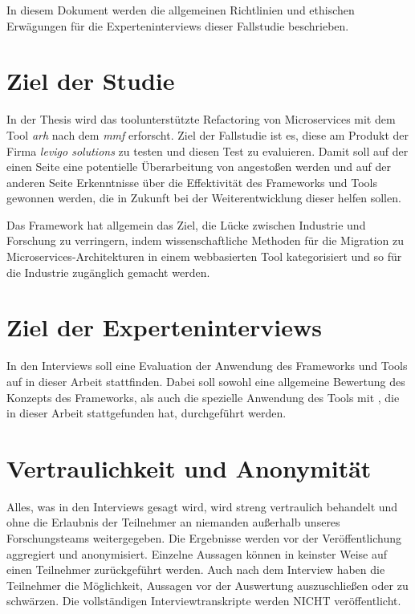 In diesem Dokument werden die allgemeinen Richtlinien und ethischen Erwägungen für die Experteninterviews dieser Fallstudie beschrieben.

\section{Ziel der Studie}

In der Thesis wird das toolunterstützte Refactoring von Microservices mit dem Tool \emph{\acrlong{arh}} nach dem \emph{\acrlong{mmf}} erforscht.
Ziel der Fallstudie ist es, diese am Produkt \jf der Firma \emph{levigo solutions} zu testen und diesen Test zu evaluieren.
Damit soll auf der einen Seite eine potentielle Überarbeitung von \jf angestoßen werden und auf der anderen Seite Erkenntnisse über die Effektivität des Frameworks und Tools gewonnen werden, die in Zukunft bei der Weiterentwicklung dieser helfen sollen.

Das Framework hat allgemein das Ziel, die Lücke zwischen Industrie und Forschung zu verringern, indem wissenschaftliche Methoden für die Migration zu Microservices-Architekturen in einem webbasierten Tool kategorisiert und so für die Industrie zugänglich gemacht werden.

\section{Ziel der Experteninterviews}

In den Interviews soll eine Evaluation der Anwendung des Frameworks und Tools auf \jf in dieser Arbeit stattfinden.
Dabei soll sowohl eine allgemeine Bewertung des Konzepts des Frameworks, als auch die spezielle Anwendung des Tools mit \jf, die in dieser Arbeit stattgefunden hat, durchgeführt werden.

\section{Vertraulichkeit und Anonymität}
Alles, was in den Interviews gesagt wird, wird streng vertraulich behandelt und ohne die Erlaubnis der Teilnehmer an niemanden außerhalb unseres Forschungsteams weitergegeben.
Die Ergebnisse werden vor der Veröffentlichung aggregiert und anonymisiert.
Einzelne Aussagen können in keinster Weise auf einen Teilnehmer zurückgeführt werden.
Auch nach dem Interview haben die Teilnehmer die Möglichkeit, Aussagen vor der Auswertung auszuschließen oder zu schwärzen.
Die vollständigen Interviewtranskripte werden NICHT veröffentlicht.

